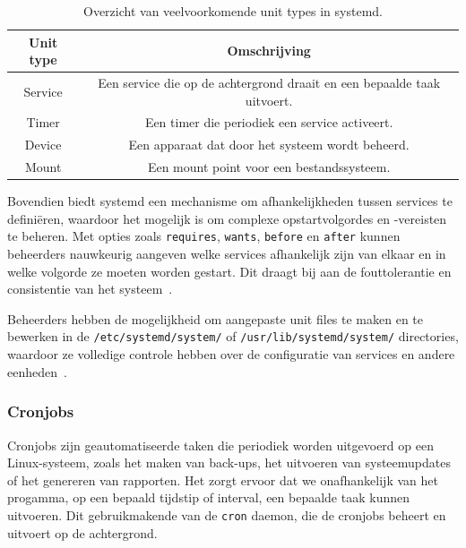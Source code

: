 \begin{table}[!h]
    \begin{center}
        \begin{tabular}{ c c }
            \hline
                Unit type & Omschrijving \\ [0.5ex] 
            \hline
                Service & Een service die op de achtergrond draait en een bepaalde taak uitvoert. \\
                Timer   & Een timer die periodiek een service activeert. \\
                Device  & Een apparaat dat door het systeem wordt beheerd. \\
                Mount   & Een mount point voor een bestandssysteem. \\
        \end{tabular}
    \end{center}
    \caption[Veelvoorkomende unit types in systemd.]{Overzicht van veelvoorkomende unit types in systemd.}
    \label{table:sytemd_unit_types}
\end{table}

Bovendien biedt systemd een mechanisme om afhankelijkheden tussen services te definiëren, waardoor het mogelijk is om complexe opstartvolgordes en -vereisten te beheren.
Met opties zoals \texttt{requires}, \texttt{wants}, \texttt{before} en \texttt{after} kunnen beheerders nauwkeurig aangeven welke services afhankelijk zijn van elkaar en in welke volgorde ze moeten worden gestart.
Dit draagt bij aan de fouttolerantie en consistentie van het systeem~\autocite{ward2021linux}.

Beheerders hebben de mogelijkheid om aangepaste unit files te maken en te bewerken in de \texttt{/etc/systemd/system/} of \texttt{/usr/lib/systemd/system/} directories, waardoor ze volledige controle hebben over de configuratie van services en andere eenheden~\autocite{ward2021linux}.

\subsubsection{Cronjobs}
\label{linux_cronjobs}

Cronjobs zijn geautomatiseerde taken die periodiek worden uitgevoerd op een Linux-systeem, zoals het maken van back-ups, het uitvoeren van systeemupdates of het genereren van rapporten.
Het zorgt ervoor dat we onafhankelijk van het progamma, op een bepaald tijdstip of interval, een bepaalde taak kunnen uitvoeren.
Dit gebruikmakende van de \texttt{cron} daemon, die de cronjobs beheert en uitvoert op de achtergrond.

